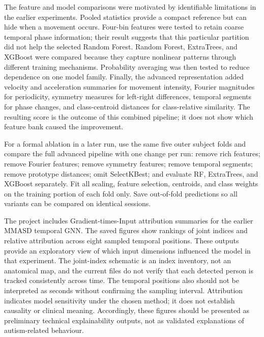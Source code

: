 \documentclass[a4paper,12pt]{report}
\begin{document}
The feature and model comparisons were motivated by identifiable limitations in the earlier experiments. Pooled statistics provide a compact reference but can hide when a movement occurs. Four-bin features were tested to retain coarse temporal phase information; their result suggests that this particular partition did not help the selected Random Forest. Random Forest, ExtraTrees, and XGBoost were compared because they capture nonlinear patterns through different training mechanisms. Probability averaging was then tested to reduce dependence on one model family. Finally, the advanced representation added velocity and acceleration summaries for movement intensity, Fourier magnitudes for periodicity, symmetry measures for left-right differences, temporal segments for phase changes, and class-centroid distances for class-relative similarity. The resulting score is the outcome of this combined pipeline; it does not show which feature bank caused the improvement.

For a formal ablation in a later run, use the same five outer subject folds and compare the full advanced pipeline with one change per run: remove rich features; remove Fourier features; remove symmetry features; remove temporal segments; remove prototype distances; omit SelectKBest; and evaluate RF, ExtraTrees, and XGBoost separately. Fit all scaling, feature selection, centroids, and class weights on the training portion of each fold only. Save out-of-fold predictions so all variants can be compared on identical sessions.

The project includes Gradient-times-Input attribution summaries for the earlier MMASD temporal GNN. The saved figures show rankings of joint indices and relative attribution across eight sampled temporal positions. These outputs provide an exploratory view of which input dimensions influenced the model in that experiment. The joint-index schematic is an index inventory, not an anatomical map, and the current files do not verify that each detected person is tracked consistently across time. The temporal positions also should not be interpreted as seconds without confirming the sampling interval. Attribution indicates model sensitivity under the chosen method; it does not establish causality or clinical meaning. Accordingly, these figures should be presented as preliminary technical explainability outputs, not as validated explanations of autism-related behaviour.
\end{document}
